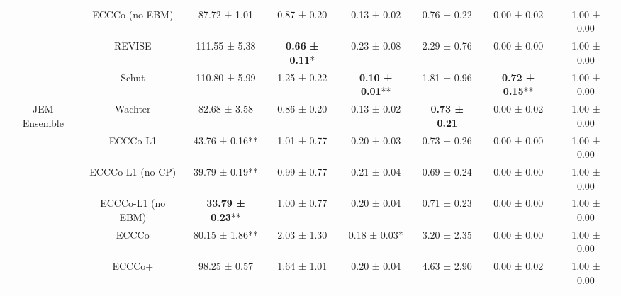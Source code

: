 \begin{table}
{\begin{tabular}[t]{cccccccc}
 & ECCCo (no EBM) & 87.72 ± 1.01\hphantom{*}\hphantom{*} & 0.87 ± 0.20\hphantom{*}\hphantom{*} & 0.13 ± 0.02\hphantom{*}\hphantom{*} & 0.76 ± 0.22\hphantom{*}\hphantom{*} & 0.00 ± 0.02\hphantom{*}\hphantom{*} & 1.00 ± 0.00\hphantom{*}\hphantom{*}\\

 & REVISE & 111.55 ± 5.38\hphantom{*}\hphantom{*} & \textbf{0.66 ± 0.11}*\hphantom{*} & 0.23 ± 0.08\hphantom{*}\hphantom{*} & 2.29 ± 0.76\hphantom{*}\hphantom{*} & 0.00 ± 0.00\hphantom{*}\hphantom{*} & 1.00 ± 0.00\hphantom{*}\hphantom{*}\\

 & Schut & 110.80 ± 5.99\hphantom{*}\hphantom{*} & 1.25 ± 0.22\hphantom{*}\hphantom{*} & \textbf{0.10 ± 0.01}** & 1.81 ± 0.96\hphantom{*}\hphantom{*} & \textbf{0.72 ± 0.15}** & 1.00 ± 0.00\hphantom{*}\hphantom{*}\\

\multirow[t]{-10}{*}{\centering\arraybackslash JEM Ensemble} & Wachter & 82.68 ± 3.58\hphantom{*}\hphantom{*} & 0.86 ± 0.20\hphantom{*}\hphantom{*} & 0.13 ± 0.02\hphantom{*}\hphantom{*} & \textbf{0.73 ± 0.21}\hphantom{*}\hphantom{*} & 0.00 ± 0.02\hphantom{*}\hphantom{*} & 1.00 ± 0.00\hphantom{*}\hphantom{*}\\
\cmidrule{1-8}
 & ECCCo-L1 & 43.76 ± 0.16** & 1.01 ± 0.77\hphantom{*}\hphantom{*} & 0.20 ± 0.03\hphantom{*}\hphantom{*} & 0.73 ± 0.26\hphantom{*}\hphantom{*} & 0.00 ± 0.00\hphantom{*}\hphantom{*} & 1.00 ± 0.00\hphantom{*}\hphantom{*}\\

 & ECCCo-L1 (no CP) & 39.79 ± 0.19** & 0.99 ± 0.77\hphantom{*}\hphantom{*} & 0.21 ± 0.04\hphantom{*}\hphantom{*} & 0.69 ± 0.24\hphantom{*}\hphantom{*} & 0.00 ± 0.00\hphantom{*}\hphantom{*} & 1.00 ± 0.00\hphantom{*}\hphantom{*}\\

 & ECCCo-L1 (no EBM) & \textbf{33.79 ± 0.23}** & 1.00 ± 0.77\hphantom{*}\hphantom{*} & 0.20 ± 0.04\hphantom{*}\hphantom{*} & 0.71 ± 0.23\hphantom{*}\hphantom{*} & 0.00 ± 0.00\hphantom{*}\hphantom{*} & 1.00 ± 0.00\hphantom{*}\hphantom{*}\\

 & ECCCo & 80.15 ± 1.86** & 2.03 ± 1.30\hphantom{*}\hphantom{*} & 0.18 ± 0.03*\hphantom{*} & 3.20 ± 2.35\hphantom{*}\hphantom{*} & 0.00 ± 0.00\hphantom{*}\hphantom{*} & 1.00 ± 0.00\hphantom{*}\hphantom{*}\\

 & ECCCo+ & 98.25 ± 0.57\hphantom{*}\hphantom{*} & 1.64 ± 1.01\hphantom{*}\hphantom{*} & 0.20 ± 0.04\hphantom{*}\hphantom{*} & 4.63 ± 2.90\hphantom{*}\hphantom{*} & 0.00 ± 0.02\hphantom{*}\hphantom{*} & 1.00 ± 0.00\hphantom{*}\hphantom{*}\\


\end{tabular}}
\end{table}
